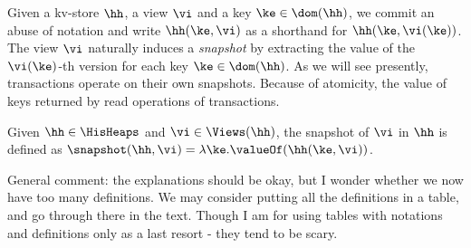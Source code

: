 Given a kv-store $\hh$, a view $\vi$ and a key $\ke \in \dom(\hh)$, 
we commit an abuse of notation and write $\hh(\ke, \vi)$ as a shorthand 
for $\hh(\ke, \vi(\ke))$. The view $\vi$ naturally induces a \emph{snapshot} 
by extracting the value of the $\vi(\ke)$-th version for each key $\ke \in \dom(\hh)$. 
As we will see presently, transactions operate on their own snapshots.
Because of atomicity, the value of keys returned 
by read operations of transactions. 
\begin{definition}[Snapshots]
\label{def:heaps}
\label{def:snapshot}
Given $\hh \in \HisHeaps$ and $\vi \in \Views(\hh)$, the snapshot of $\vi$ in 
$\hh$ is defined as $\snapshot(\hh, \vi) = \lambda \ke. \valueOf(\hh(\ke, \vi))$.
\end{definition}

\ac{General comment: the explanations should be okay, but I wonder whether we now have 
too many definitions. We may consider putting all the definitions in a table, and 
go through there in the text. Though I am for using tables with notations and 
definitions only as a last resort - they tend to be scary.}

